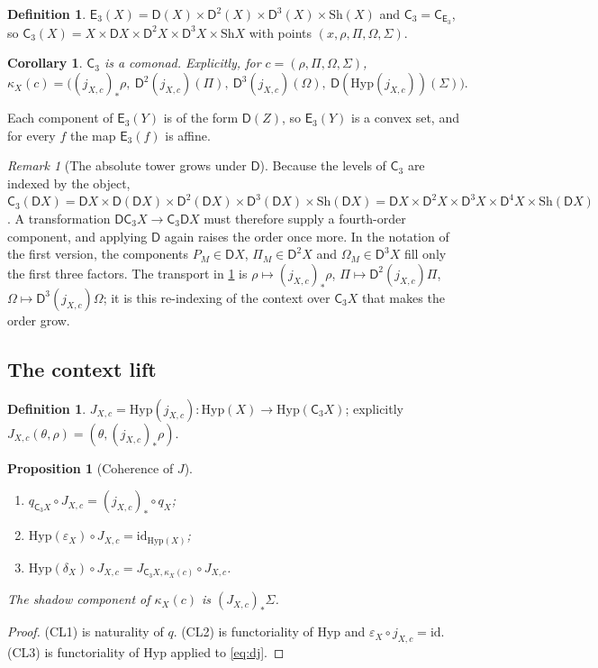 \documentclass[11pt]{article}
\newtheorem{proposition}[theorem]{Proposition}
\newtheorem{corollary}[theorem]{Corollary}
\theoremstyle{definition}
\newtheorem{definition}[theorem]{Definition}
\theoremstyle{remark}
\newtheorem{remark}[theorem]{Remark}
\newcommand{\D}{\mathsf{D}}
\newcommand{\Hyp}{\mathrm{Hyp}}
\newcommand{\Sh}{\mathrm{Sh}}
\newcommand{\C}{\mathsf{C}}
\newcommand{\E}{\mathsf{E}}
\newcommand{\id}{\mathrm{id}}
\begin{document}
\begin{definition}
$\E_3(X)=\D(X)\times\D^2(X)\times\D^3(X)\times\Sh(X)$ and
$\C_3=\C_{\E_3}$, so $\C_3(X)=X\times\D X\times\D^2X\times\D^3X\times\Sh X$ with points
$(x,\rho,\Pi,\Omega,\Sigma)$.
\end{definition}

\begin{corollary}\label{cor:C3}
$\C_3$ is a comonad. Explicitly, for $c=(\rho,\Pi,\Omega,\Sigma)$,
\[
\kappa_X(c)=\big((j_{X,c})_*\rho,\ \D^2(j_{X,c})(\Pi),\ \D^3(j_{X,c})(\Omega),\
\D(\Hyp(j_{X,c}))(\Sigma)\big).
\]
\end{corollary}

Each component of $\E_3(Y)$ is of the form $\D(Z)$, so $\E_3(Y)$ is a convex set, and for every $f$
the map $\E_3(f)$ is affine.

\begin{remark}[The absolute tower grows under $\D$]\label{rem:growth}
Because the levels of $\C_3$ are indexed by the object,
$\C_3(\D X)=\D X\times\D(\D X)\times\D^2(\D X)\times\D^3(\D X)\times\Sh(\D X)
=\D X\times\D^2X\times\D^3X\times\D^4X\times\Sh(\D X)$. A transformation
$\D\C_3X\to\C_3\D X$ must therefore supply a fourth-order component, and applying $\D$ again raises
the order once more. In the notation of the first version, the components $P_M\in\D X$,
$\Pi_M\in\D^2X$ and $\Omega_M\in\D^3X$ fill only the first three factors. The transport in
\cref{cor:C3} is $\rho\mapsto(j_{X,c})_*\rho$, $\Pi\mapsto\D^2(j_{X,c})\Pi$,
$\Omega\mapsto\D^3(j_{X,c})\Omega$; it is this re-indexing of the context over $\C_3X$ that makes the
order grow.
\end{remark}

\subsection{The context lift}

\begin{definition}
$J_{X,c}=\Hyp(j_{X,c})\colon\Hyp(X)\to\Hyp(\C_3X)$; explicitly
$J_{X,c}(\theta,\rho)=(\theta,(j_{X,c})_*\rho)$.
\end{definition}

\begin{proposition}[Coherence of $J$]\label{prop:CL}
\begin{enumerate}[label=(CL\arabic*)]
\item $q_{\C_3X}\circ J_{X,c}=(j_{X,c})_*\circ q_X$;
\item $\Hyp(\varepsilon_X)\circ J_{X,c}=\id_{\Hyp(X)}$;
\item $\Hyp(\delta_X)\circ J_{X,c}=J_{\C_3X,\kappa_X(c)}\circ J_{X,c}$.
\end{enumerate}
The shadow component of $\kappa_X(c)$ is $(J_{X,c})_*\Sigma$.
\end{proposition}
\begin{proof}
(CL1) is naturality of $q$. (CL2) is functoriality of $\Hyp$ and
$\varepsilon_X\circ j_{X,c}=\id$. (CL3) is functoriality of $\Hyp$ applied to \eqref{eq:dj}.
\end{proof}
\end{document}
